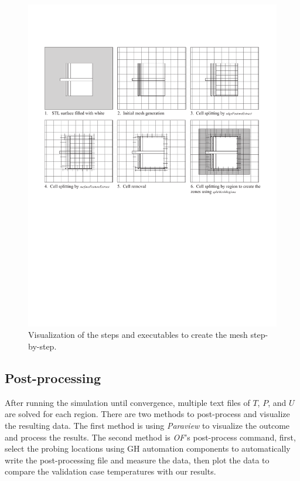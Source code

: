 \begin{figure}[htb]
     \centering
    \includegraphics[trim=1cm 11cm 1cm 3cm, clip, width=1\linewidth]{Figures/snappyhex.pdf}
     \caption[Mesh Creation Steps]{Visualization of the steps and executables to create the mesh step-by-step.}
   \label{meshsteps}
 \end{figure}


\subsection{Post-processing}
After running the simulation until convergence, multiple text files of $T$, $P$, and $U$ are solved for each region. There are two methods to post-process and visualize the resulting data. The first method is using \textit{Paraview} to visualize the outcome and process the results. The second method is \textit{\gls{OF}}'s post-process command, first, select the probing locations using \gls{GH} automation components to automatically write the post-processing file and measure the data, then plot the data to compare the validation case temperatures with our results. 



